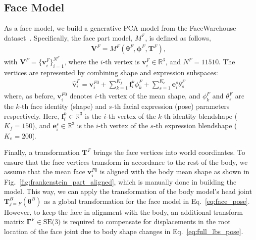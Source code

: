\subsection{Face Model}
\label{subsection:face}
As a face model, we build a generative PCA model from the FaceWarehouse dataset~\cite{cao2014facewarehouse}. Specifically, the face part model, $M^F$, is defined as follows,
\begin{align}
\mathbf{V}^F = M^F (\boldsymbol{\theta}^F, \boldsymbol{\phi}^F, \mathbf{T}^F ),
\end{align}
with $\mathbf{V}^F = \{ \mathbf{v}^F_i\}_{i=1}^{N^F}$, where the $i$-th vertex is $\mathbf{v}^F_i\in\mathds{R}^3$, and $N^F{=}11510$. The vertices are represented by combining shape and expression subspaces:
\begin{align}
\hat{\mathbf{v}}_i^F = \mathbf{v}^{F0}_i + \sum_{k=1}^{K_{f}} \mathbf{f}^k_{i} \phi^F_k  + \sum_{s=1}^{K_{e}} \mathbf{e}^s_{i} \theta^F_s
\label{eq:face_shape}
\end{align}
where, as before, $\mathbf{v}^{F0}_i$ denotes $i$-th vertex of the mean shape, and $\phi^F_k$ and $\theta^F_s$ are the $k$-th face identity (shape) and $s$-th facial expression (pose) parameters respectively. Here, $\mathbf{f}^k_i\in\mathds{R}^3$ is the $i$-th vertex of the $k$-th identity blendshape ($K_{f}=150$), and $\mathbf{e}^s_i\in\mathds{R}^3$ is the $i$-th vertex of the $s$-th expression blendshape ($K_{e}=200$). 

Finally, a transformation $\mathbf{T}^F$ brings the face vertices into world coordinates. To ensure that the face vertices transform in accordance to the rest of the body, we assume that the mean face $\mathbf{v}^{F0}_i$ is aligned with the body mean shape as shown in Fig.~\ref{fig:frankenstein_part_aligned}, which is manually done in building the model. This way, we can apply the transformation of the body model's head joint $\mathbf{T}^B_{j=F}(\boldsymbol{\theta}^B)$ as a global transformation for the face model in Eq.~\ref{eq:face_pose}. However, to keep the face in alignment with the body, an additional transform matrix $\mathbf{\Gamma}^F \in \textrm{SE(3)}$ is required to compensate for displacements in the root location of the face joint due to body shape changes in Eq.~\ref{eq:full_lbs_pose}. 

